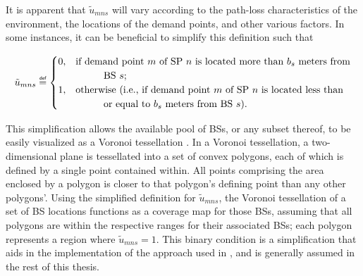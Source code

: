 \documentclass[12pt,dvipsnames]{report}
\newif\ifisdoublespacing
\newcommand\defeq{\mathrel{\overset{\makebox[0pt]{\mbox{\normalfont\tiny\sffamily def}}}{=}}}
\newcommand\tab[1][1cm]{\hspace*{#1}}
\begin{document}
It is apparent that $\tilde{u}_{mns}$ will vary according to the path-loss characteristics of the environment, the locations of the demand points, and other various factors.  In some instances, it can be beneficial to simplify this definition such that

\ifisdoublespacing
\begin{singlespacing}
\begin{equation} \label{eq:umns_simp}
\tilde{u}_{mns} \defeq
	\begin{cases}
		0,& \text{if demand point $m$ of SP $n$ is located more than $b_s$ meters from}\\
		& \text{\tab BS $s$;}\\
		\\
		1,& \text{otherwise (i.e., if demand point $m$ of SP $n$ is located less than}\\
		& \text{\tab or equal to $b_s$ meters from BS $s$).}\\
	\end{cases}
\end{equation}
\end{singlespacing}
\else
\begin{equation} \label{eq:umns_simp}
\tilde{u}_{mns} \defeq
	\begin{cases}
		0,& \text{if demand point $m$ of SP $n$ is located more than $b_s$ meters from}\\
		& \text{\tab BS $s$;}\\
		1,& \text{otherwise (i.e., if demand point $m$ of SP $n$ is located less than}\\
		& \text{\tab or equal to $b_s$ meters from BS $s$).}\\
	\end{cases}
\end{equation}
\fi

This simplification allows the available pool of BSs, or any subset thereof, to be easily visualized as a Voronoi tessellation \cite{Aurenhammer:1991:VDS:116873.116880}.  In a Voronoi tessellation, a two-dimensional plane is tessellated into a set of convex polygons, each of which is defined by a single point contained within.  All points comprising the area enclosed by a polygon is closer to that polygon's defining point than any other polygons'.  Using the simplified definition for $\tilde{u}_{mns}$, the Voronoi tessellation of a set of BS locations functions as a coverage map for those BSs, assuming that all polygons are within the respective ranges for their associated BSs; each polygon represents a region where $\tilde{u}_{mns} = 1$.  This binary condition is a simplification that aids in the implementation of the approach used in , and is generally assumed in the rest of this thesis.
\end{document}
